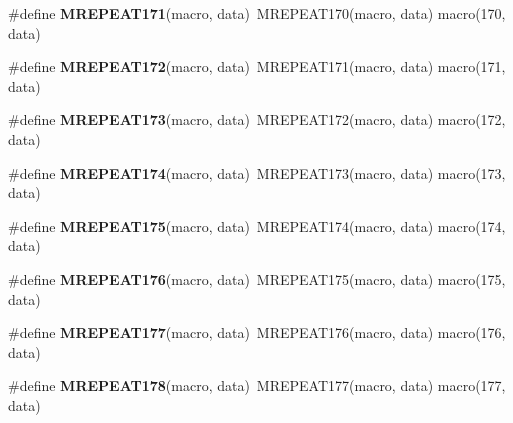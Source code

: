 \begin{DoxyCompactItemize}
\item 
\hypertarget{group__group__xmega__utils__mrepeat_ga4f35da901f3f846301ba22c2ebfd64a4}{\#define {\bfseries M\-R\-E\-P\-E\-A\-T171}(macro, data)~M\-R\-E\-P\-E\-A\-T170(macro, data)   macro(170, data)}\label{group__group__xmega__utils__mrepeat_ga4f35da901f3f846301ba22c2ebfd64a4}

\item 
\hypertarget{group__group__xmega__utils__mrepeat_ga6eb1cc1bab798bbc69ffcf54897bb268}{\#define {\bfseries M\-R\-E\-P\-E\-A\-T172}(macro, data)~M\-R\-E\-P\-E\-A\-T171(macro, data)   macro(171, data)}\label{group__group__xmega__utils__mrepeat_ga6eb1cc1bab798bbc69ffcf54897bb268}

\item 
\hypertarget{group__group__xmega__utils__mrepeat_ga5882213b7cc6587681221c190929a058}{\#define {\bfseries M\-R\-E\-P\-E\-A\-T173}(macro, data)~M\-R\-E\-P\-E\-A\-T172(macro, data)   macro(172, data)}\label{group__group__xmega__utils__mrepeat_ga5882213b7cc6587681221c190929a058}

\item 
\hypertarget{group__group__xmega__utils__mrepeat_ga2a61cb0b2664714f05b8b60b1430e182}{\#define {\bfseries M\-R\-E\-P\-E\-A\-T174}(macro, data)~M\-R\-E\-P\-E\-A\-T173(macro, data)   macro(173, data)}\label{group__group__xmega__utils__mrepeat_ga2a61cb0b2664714f05b8b60b1430e182}

\item 
\hypertarget{group__group__xmega__utils__mrepeat_gaaad2bc103b928f34a3dc0a556f252b02}{\#define {\bfseries M\-R\-E\-P\-E\-A\-T175}(macro, data)~M\-R\-E\-P\-E\-A\-T174(macro, data)   macro(174, data)}\label{group__group__xmega__utils__mrepeat_gaaad2bc103b928f34a3dc0a556f252b02}

\item 
\hypertarget{group__group__xmega__utils__mrepeat_gabc62b219e91e0d7826b32e29b7dd3834}{\#define {\bfseries M\-R\-E\-P\-E\-A\-T176}(macro, data)~M\-R\-E\-P\-E\-A\-T175(macro, data)   macro(175, data)}\label{group__group__xmega__utils__mrepeat_gabc62b219e91e0d7826b32e29b7dd3834}

\item 
\hypertarget{group__group__xmega__utils__mrepeat_ga002048f3987041ffb748ab027b75d2cb}{\#define {\bfseries M\-R\-E\-P\-E\-A\-T177}(macro, data)~M\-R\-E\-P\-E\-A\-T176(macro, data)   macro(176, data)}\label{group__group__xmega__utils__mrepeat_ga002048f3987041ffb748ab027b75d2cb}

\item 
\hypertarget{group__group__xmega__utils__mrepeat_gaba5fc88c5803e8272ce412fea9e908a3}{\#define {\bfseries M\-R\-E\-P\-E\-A\-T178}(macro, data)~M\-R\-E\-P\-E\-A\-T177(macro, data)   macro(177, data)}\label{group__group__xmega__utils__mrepeat_gaba5fc88c5803e8272ce412fea9e908a3}


\end{DoxyCompactItemize}

